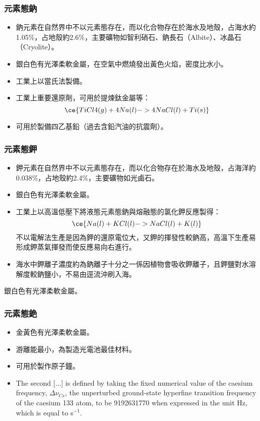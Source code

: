 \documentclass[a4paper,12pt]{report}
\begin{document}
\begin{itemize}
\begin{itemize}
\subsubsection{元素態鈉}
\begin{itemize}
\item 鈉元素在自然界中不以元素態存在，而以化合物存在於海水及地殼，占海水約1.05\%，占地殼約2.6\%，主要礦物如智利硝石、鈉長石（Albite）、冰晶石（Cryolite）。
\item 銀白色有光澤柔軟金屬，在空氣中燃燒發出黃色火焰，密度比水小。
\item 工業上以當氏法製備。
\item 工業上重要還原劑，可用於提煉鈦金屬等：
\[\ce{TiCl4(g) + 4Na(l) -> 4NaCl(l) + Ti(s)}\]
\item 可用於製備四乙基鉛（過去含鉛汽油的抗震劑）。
\end{itemize}
\subsubsection{元素態鉀}
\begin{itemize}
\item 鉀元素在自然界中不以元素態存在，而以化合物存在於海水及地殼，占海洋約0.038\%，占地殼約2.4\%，主要礦物如光鹵石。
\item 銀白色有光澤柔軟金屬。
\item 工業上以高溫低壓下將液態元素態鈉與熔融態的氯化鉀反應製得：
\[\ce{Na(l) + KCl(l) -> NaCl(l) + K(l)}\]
不以電解法生產是因為鉀的還原電位大，又鉀的揮發性較鈉高，高溫下生產易形成鉀蒸氣揮發而使反應易向右進行。
\item 海水中鉀離子濃度約為鈉離子十分之一係因植物會吸收鉀離子，且鉀鹽對水溶解度較鈉鹽小，不易由逕流沖刷入海。
\end{itemize}
銀白色有光澤柔軟金屬。
\subsubsection{元素態銫}
\begin{itemize}
\item 金黃色有光澤柔軟金屬。
\item 游離能最小，為製造光電池最佳材料。
\item 可用於製作原子鐘。
\item The second [...] is defined by taking the fixed numerical value of the caesium frequency, $\Delta\nu_{Cs}$, the unperturbed ground-state hyperfine transition frequency of the caesium 133 atom, to be 9192631770 when expressed in the unit Hz, which is equal to s$^{-1}$.
\end{itemize}

\end{itemize}
\end{itemize}
\end{document}
